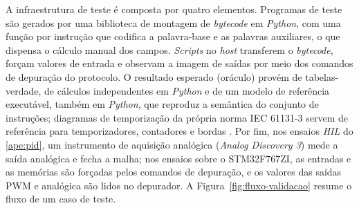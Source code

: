 A infraestrutura de teste é composta por quatro elementos.
Programas de teste são gerados por uma biblioteca de montagem de \textit{bytecode} em \textit{Python}, com uma função por instrução que codifica a palavra-base e as palavras auxiliares, o que dispensa o cálculo manual dos campos.
\textit{Scripts} no \textit{host} transferem o \textit{bytecode}, forçam valores de entrada e observam a imagem de saídas por meio dos comandos de depuração do protocolo.
O resultado esperado (oráculo) provém de tabelas-verdade, de cálculos independentes em \textit{Python} e de um modelo de referência executável, também em \textit{Python}, que reproduz a semântica do conjunto de instruções; diagramas de temporização da própria norma IEC 61131-3 servem de referência para temporizadores, contadores e bordas \cite{iec:2025}.
Por fim, nos ensaios \textit{HIL} do \ref{ape:pid}, um instrumento de aquisição analógica (\textit{Analog Discovery 3}) mede a saída analógica e fecha a malha; nos ensaios sobre o STM32F767ZI, as entradas e as memórias são forçadas pelos comandos de depuração, e os valores das saídas PWM e analógica são lidos no depurador.
A Figura~\ref{fig:fluxo-validacao} resume o fluxo de um caso de teste.

\begin{figurafixa}
    \centering
    \label{fig:fluxo-validacao}

\end{figurafixa}

